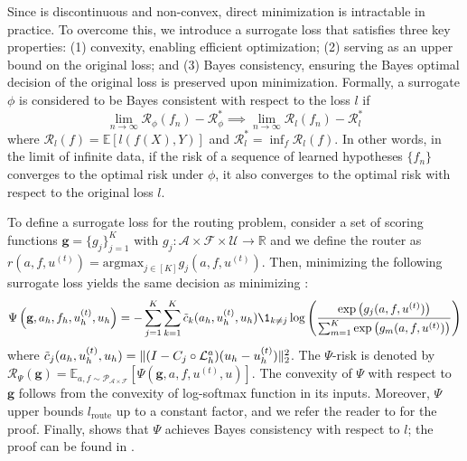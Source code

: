 \documentclass{article} %
\begin{document}
Since  is discontinuous and non-convex, direct minimization is intractable in practice. To overcome this, we introduce a surrogate loss that satisfies three key properties: (1) convexity, enabling efficient optimization; (2) serving as an upper bound on the original loss; and (3) Bayes consistency, ensuring the Bayes optimal decision of the original loss is preserved upon minimization. Formally, a surrogate $\phi$ is considered to be Bayes consistent with respect to the loss $l$ if 
\begin{equation*}
    \lim_{n \to \infty} \mathcal{R}_{\phi}(f_n) - \mathcal{R}_{\phi}^* \implies \lim_{n \to \infty} \mathcal{R}_{l}(f_n) - \mathcal{R}_{l}^* 
\end{equation*}
where $\mathcal{R}_{l}(f) = \mathbb{E}\left[l(f(X), Y)\right]$ and $\mathcal{R}_{l}^* = \inf_f\mathcal{R}_{l}(f)$. In other words, in the limit of infinite data, if the risk of a sequence of learned hypotheses $\{f_n\}$ converges to the optimal risk under $\phi$, it also converges to the optimal risk with respect to the original loss $l$.

To define a surrogate loss for the routing problem, consider a set of scoring functions $\mathbf{g} =\{g_j\}_{j = 1}^K$ with $g_j: \mathcal{A} \times \mathcal{F} \times \mathcal{U} \to \mathbb{R}$ and we define the router as $r(a, f, u^{(t)}) = \text{argmax}_{j \in [K]} g_j(a, f, u^{(t)})$. Then, minimizing the following surrogate loss yields the same decision as minimizing :
\begin{equation} \label{eq:routersurrogate}
    \Psi\left(\mathbf{g}, a_h, f_h, u^{(t)}_h, u_h\right) = -\sum_{j = 1}^K \sum_{k = 1}^K\Tilde{c}_k(a_h, u^{(t)}_h, u_h)\1_{k\neq j}\log\left(\frac{\exp\left(g_j(a, f, u^{(t)})\right)}{\sum_{m = 1}^K\exp\left(g_m(a, f, u^{(t)})\right)}\right)
\end{equation}
where $\Tilde{c}_j(a_h, u^{(t)}_h, u_h) = \|( I - C_{j} \circ \mathcal{L}_{h}^a)(u_h - u^{(t)}_h)\|^2_2$.
The $\Psi$-risk is denoted by $\mathcal{R}_{\Psi}\left(\mathbf{g}\right) = \mathbb{E}_{a, f \sim \mathcal{P}_{\mathcal{A} \times \mathcal{F}}}\left[\Psi\left(\mathbf{g}, a, f, u^{(t)}, u\right)\right]$. The convexity of $\Psi$ with respect to $\mathbf{g}$ follows from the convexity of log-softmax function in its inputs. Moreover, $\Psi$ upper bounds $l_{\text{route}}$ up to a constant factor, and we refer the reader to  for the proof. Finally,  shows that $\Psi$ achieves Bayes consistency with respect to $l$; the proof can be found in .
\end{document}
